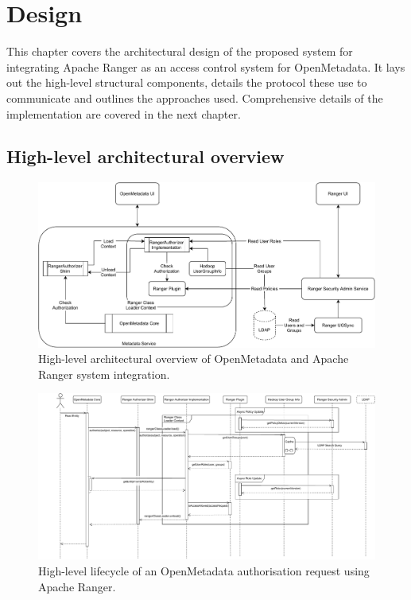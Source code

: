 \chapter{Design}

This chapter covers the architectural design of the proposed system for integrating Apache Ranger as an access control system for OpenMetadata. It lays out the high-level structural components, details the protocol these use to communicate and outlines the approaches used. Comprehensive details of the implementation are covered in the next chapter.

\section{High-level architectural overview}

\begin{figure}
    \centering
    \includegraphics[width=\textwidth]{chapters/design/figures/openmetadata-ranger-arch.pdf}
    \caption{High-level architectural overview of OpenMetadata and Apache Ranger system integration.}
    \label{fig:openmetadata-ranger-arch}
\end{figure}

\begin{figure}
    \centering
    \includegraphics[width=\textwidth]{chapters/design/figures/openmetadata-ranger-lifecycle.pdf}
    \caption{High-level lifecycle of an  OpenMetadata authorisation request using Apache Ranger.}
    \label{fig:openmetadata-ranger-lifecycle}
\end{figure}

